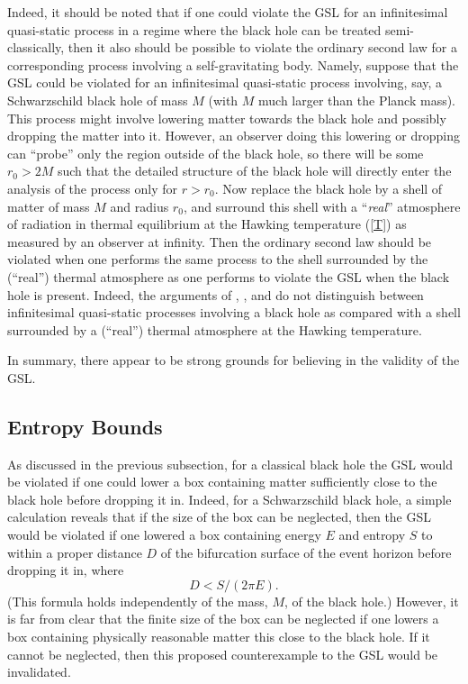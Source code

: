 Indeed, it should be noted that if one could violate the GSL for an
infinitesimal quasi-static process in a regime where the black hole
can be treated semi-classically, then it also should be possible to
violate the ordinary second law for a corresponding process involving
a self-gravitating body. Namely, suppose that the GSL could be
violated for an infinitesimal quasi-static process involving, say, a
Schwarzschild black hole of mass $M$ (with $M$ much larger than the
Planck mass). This process might involve lowering matter towards the
black hole and possibly dropping the matter into it. However, an
observer doing this lowering or dropping can ``probe'' only the region
outside of the black hole, so there will be some $r_0 > 2M$ such that
the detailed structure of the black hole will directly enter the
analysis of the process only for $r > r_0$. Now replace the black hole
by a shell of matter of mass $M$ and radius $r_0$, and surround this
shell with a ``{\em real}'' atmosphere of radiation in thermal
equilibrium at the Hawking temperature (\ref{T}) as measured by an
observer at infinity. Then the ordinary second law should be violated
when one performs the same process to the shell surrounded by the
(``real'') thermal atmosphere as one performs to violate the GSL when
the black hole is present. Indeed, the arguments of \cite{tz},
\cite{tzp}, and \cite{w4} do not distinguish between infinitesimal
quasi-static processes involving a black hole as compared with a shell
surrounded by a (``real'') thermal atmosphere at the Hawking
temperature.

In summary, there appear to be strong grounds for believing in the
validity of the GSL.


\subsection{Entropy Bounds}
\label{eb}

As discussed in the previous subsection, for a classical black hole
the GSL would be violated if one could lower a box containing matter
sufficiently close to the black hole before dropping it in. Indeed,
for a Schwarzschild black hole, a simple calculation reveals that if
the size of the box can be neglected, then the GSL would be violated
if one lowered a box containing energy $E$ and entropy $S$ to within a
proper distance $D$ of the bifurcation surface of the event horizon
before dropping it in, where
\begin{equation}
D < S/(2\pi E) .
\label{D}
\end{equation}
(This formula holds independently of the mass, $M$, of the black
hole.)  However, it is far from clear that the finite size of the box
can be neglected if one lowers a box containing physically reasonable
matter this close to the black hole. If it cannot be neglected, then
this proposed counterexample to the GSL would be invalidated.

